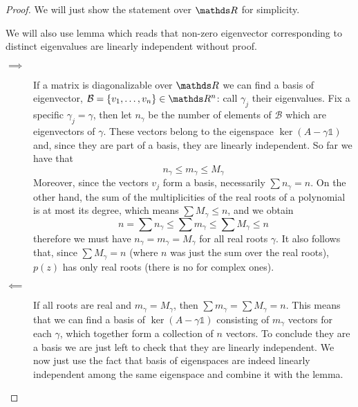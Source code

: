 \documentclass[12pt]{extarticle}
\numberwithin{equation}{section}
\begin{document}
\begin{proof}
    We will just show the statement over $\R$ for simplicity.

    We will also use lemma which reads that non-zero eigenvector corresponding
    to distinct eigenvalues are linearly independent without proof.

    \begin{description}
        \item[$\implies$] If a matrix is diagonalizable over $\R$ we can find a basis of eigenvector,
              $\mathcal B = \{v_1, \dots, v_n \} \in \R^n$: call $\gamma_j$ their eigenvalues.
              Fix a specific $\gamma_j = \gamma$, then let $n_\gamma$ be the number of elements of $\mathcal B$
              which are eigenvectors of $\gamma$.
              These vectors belong to the eigenspace $\ker (A - \gamma \mathds 1)$ and,
              since they are part of a basis, they are linearly independent.
              So far we have that
              \begin{equation}
                  n_\gamma \leq m_\gamma \leq M_\gamma
              \end{equation}
              Moreover, since the vectors $v_j$ form a basis, necessarily $\sum n_\gamma = n$.
              On the other hand, the sum of the multiplicities of the real roots of a polynomial is at most its degree,
              which means $\sum M_\gamma \leq n$, and we obtain
              \begin{equation}
                  n = \sum n_\gamma \leq \sum m_\gamma \leq \sum M_\gamma \leq n
              \end{equation}
              therefore we must have $n_\gamma = m_\gamma = M_\gamma$ for all real roots $\gamma$.
              It also follows that, since $\sum M_\gamma = n$ (where $n$ was just the sum over the real roots),
              $p(z)$ has only real roots (there is no  for complex ones).
        \item[$\impliedby$] If all roots are real and $m_\gamma = M_\gamma$, then $\sum m_\gamma = \sum M_\gamma = n$.
              This means that we can find a basis of $\ker(A - \gamma \mathds{1})$ consisting of $m_\gamma$ vectors
              for each $\gamma$, which together form a collection of $n$ vectors.
              To conclude they are a basis we are just left to check that they are linearly independent.
              We now just use the fact that basis of eigenspaces are indeed linearly independent among the same eigenspace
              and combine it with the lemma.
    \end{description}
\end{proof}
\end{document}
